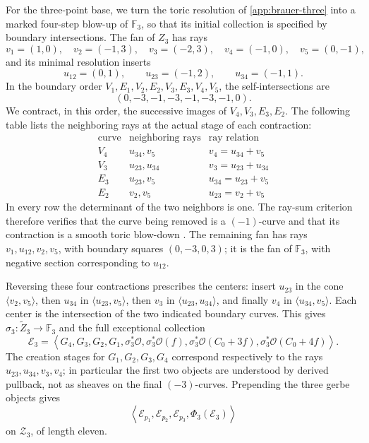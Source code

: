 \documentclass[11pt]{article}
\theoremstyle{plain}
\theoremstyle{definition}
\theoremstyle{remark}
\newcommand{\F}{\mathbb F}
\newcommand{\OO}{\mathcal O}
\begin{document}
For the three-point base, we turn the toric resolution of
\cref{app:brauer-three} into a marked four-step blow-up of \(\F_3\),
so that its initial collection is specified by boundary intersections.
The fan of \(Z_3\) has rays
\[
v_1=(1,0),\quad v_2=(-1,3),\quad v_3=(-2,3),\quad
v_4=(-1,0),\quad v_5=(0,-1),
\]
and its minimal resolution inserts
\[
u_{12}=(0,1),\qquad u_{23}=(-1,2),\qquad u_{34}=(-1,1).
\]
In the boundary order \(V_1,E_1,V_2,E_2,V_3,E_3,V_4,V_5\), the
self-intersections are
\[
(0,-3,-1,-3,-1,-3,-1,0).
\]
We contract, in this order, the
successive images of \(V_4,V_3,E_3,E_2\). The following table lists
the neighboring rays at the actual stage of each contraction:
\[
\begin{array}{c|c|c}
\text{curve}&\text{neighboring rays}&\text{ray relation}\\ \hline
V_4&u_{34},v_5&v_4=u_{34}+v_5\\
V_3&u_{23},u_{34}&v_3=u_{23}+u_{34}\\
E_3&u_{23},v_5&u_{34}=u_{23}+v_5\\
E_2&v_2,v_5&u_{23}=v_2+v_5
\end{array}
\]
In every row the determinant of the two neighbors is one. The ray-sum
criterion therefore verifies that the curve being removed is a
\((-1)\)-curve and that its contraction is a smooth toric blow-down
\cite[Theorem~10.4.4]{CoxLittleSchenck2011}. The remaining fan has rays
\(v_1,u_{12},v_2,v_5\), with boundary squares \((0,-3,0,3)\);
it is the fan of \(\F_3\), with negative section corresponding to
\(u_{12}\).

Reversing these four contractions prescribes the centers: insert
\(u_{23}\) in the cone \(\langle v_2,v_5\rangle\), then
\(u_{34}\) in \(\langle u_{23},v_5\rangle\), then \(v_3\) in
\(\langle u_{23},u_{34}\rangle\), and finally \(v_4\) in
\(\langle u_{34},v_5\rangle\). Each center is the intersection of
the two indicated boundary curves. This gives
\(\sigma_3:\widetilde Z_3\to\F_3\) and the full exceptional collection
\[
\mathscr E_3=\left\langle G_4,G_3,G_2,G_1,
\sigma_3^*\OO,\sigma_3^*\OO(f),
\sigma_3^*\OO(C_0+3f),\sigma_3^*\OO(C_0+4f)\right\rangle.
\]
The creation stages for \(G_1,G_2,G_3,G_4\) correspond respectively
to the rays \(u_{23},u_{34},v_3,v_4\); in particular the first two
objects are understood by derived pullback, not as sheaves on the final
\((-3)\)-curves. Prepending the three gerbe objects gives
\[
\left\langle\mathcal E_{p_1},\mathcal E_{p_2},\mathcal E_{p_3},
\Phi_3(\mathscr E_3)\right\rangle
\]
on \(\mathcal Z_3\), of length eleven.
\end{document}
